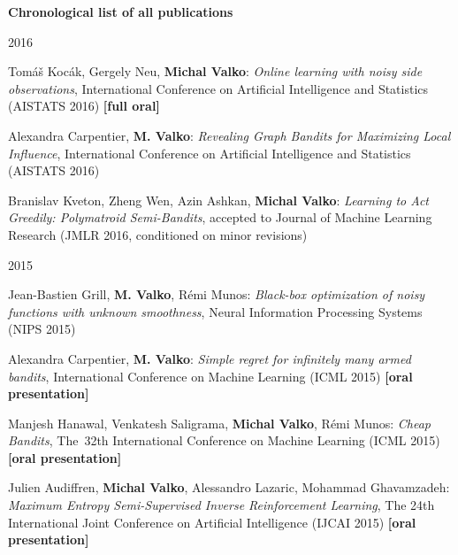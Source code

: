 \documentclass{resume}
\begin{document}
\maketitle

\begin{flushleft} 
\textbf{\sc Chronological list of all publications}
\end{flushleft} 


\begin{category}{2016}

\citembullet
Tom\'a\v s Koc\' ak, Gergely Neu, {\bf Michal Valko}:
\emph{Online learning with noisy side observations},
International Conference on Artificial Intelligence and Statistics
({\sf AISTATS 2016}) {\bf [full oral]}


\citembullet
Alexandra Carpentier, {\bf M. Valko}:
\emph{Revealing Graph Bandits for Maximizing Local Influence},
International Conference on Artificial Intelligence and Statistics
({\sf AISTATS 2016}) 


\citembullet
Branislav Kveton, Zheng Wen, Azin Ashkan, {\bf Michal Valko}:
\emph{Learning to Act Greedily: Polymatroid Semi-Bandits},
accepted to Journal of Machine Learning Research
({\sf JMLR 2016}, conditioned on minor revisions) 

\end{category}
\begin{category}{2015}

\citembullet
Jean-Bastien Grill, {\bf M. Valko}, R\' emi Munos:
\emph{Black-box optimization of noisy functions with unknown smoothness},
Neural Information Processing Systems
({\sf NIPS 2015}) 

\citembullet
Alexandra Carpentier, {\bf M. Valko}:
\emph{Simple regret for infinitely many armed bandits},
International Conference on Machine Learning
({\sf ICML 2015}) {\bf [oral presentation]}

\citembullet
Manjesh Hanawal, Venkatesh Saligrama, {\bf Michal Valko},  R\' emi Munos:
\emph{Cheap Bandits},
The~32th International Conference on Machine Learning
({\sf ICML 2015}) {\bf [oral presentation]}

\citembullet
Julien Audiffren, {\bf Michal Valko},  Alessandro Lazaric, Mohammad Ghavamzadeh:
\emph{Maximum Entropy Semi-Supervised Inverse Reinforcement Learning},
 The 24th International Joint Conference on Artificial Intelligence
({\sf IJCAI 2015}) {\bf [oral presentation]}

\end{category}
\end{document}
